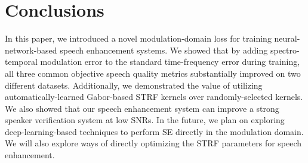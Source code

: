 \documentclass{article}
\begin{document}
\section{Conclusions}
In this paper, we introduced a novel modulation-domain loss for training neural-network-based speech enhancement systems.  We showed that by adding   spectro-temporal modulation error to the standard time-frequency error during training, all three common objective speech quality metrics substantially improved on two different datasets.  Additionally, we demonstrated the value of utilizing automatically-learned Gabor-based STRF kernels over randomly-selected kernels.  We also showed that our speech enhancement system can improve a strong speaker verification system at low SNRs.  In the future, we plan on exploring deep-learning-based techniques to perform SE directly in the modulation domain.  We will also explore ways of directly optimizing the STRF parameters for speech enhancement.

\vfill\pagebreak





\patchcmd{\thebibliography}
  {\settowidth}
  {\setlength{\itemsep}{0pt plus 0.1pt}\settowidth}
  {}{}
\apptocmd{\thebibliography}
  {\footnotesize}
  {}{}    

\end{document}
